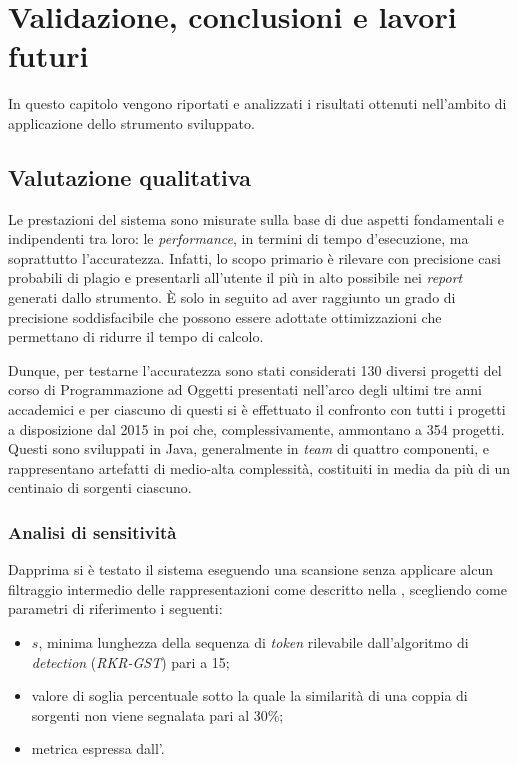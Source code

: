\chapter{Validazione, conclusioni e lavori futuri}
\label{chapter:validation}
In questo capitolo vengono riportati e analizzati i risultati ottenuti nell'ambito di applicazione dello strumento sviluppato.

\section{Valutazione qualitativa}
Le prestazioni del sistema sono misurate sulla base di due aspetti fondamentali e indipendenti tra loro: le \textit{performance}, in termini di tempo d'esecuzione, ma soprattutto l'accuratezza.
%
Infatti, lo scopo primario è rilevare con precisione casi probabili di plagio e presentarli all'utente il più in alto possibile nei \textit{report} generati dallo strumento.
%
\`E solo in seguito ad aver raggiunto un grado di precisione soddisfacibile che possono essere adottate ottimizzazioni che permettano di ridurre il tempo di calcolo.

Dunque, per testarne l'accuratezza sono stati considerati 130 diversi progetti del corso di Programmazione ad Oggetti presentati nell'arco degli ultimi tre anni accademici e per ciascuno di questi si è effettuato il confronto con tutti i progetti a disposizione dal 2015 in poi che, complessivamente, ammontano a 354 progetti.
%
Questi sono sviluppati in Java, generalmente in \textit{team} di quattro componenti, e rappresentano artefatti di medio-alta complessità, costituiti in media da più di un centinaio di sorgenti ciascuno.

\subsection{Analisi di sensitività}
Dapprima si è testato il sistema eseguendo una scansione senza applicare alcun filtraggio intermedio delle rappresentazioni come descritto nella , scegliendo come parametri di riferimento i seguenti:
\begin{itemize}
    \item $s$, minima lunghezza della sequenza di \textit{token} rilevabile dall'algoritmo di \textit{detection} (\textit{RKR-GST}) pari a 15;
    \item valore di soglia percentuale sotto la quale la similarità di una coppia di sorgenti non viene segnalata pari al 30\%;
    \item metrica espressa dall'.
\end{itemize}

